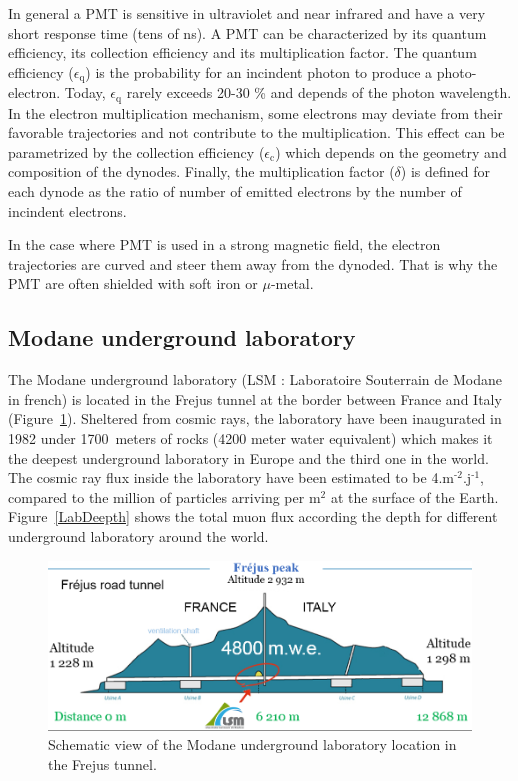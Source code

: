 \documentclass[main.tex]{subfiles}
\begin{document}
\bigskip


\NI In general a PMT is sensitive in ultraviolet and near infrared and have a very short response time (tens of ns). A PMT can be characterized by its quantum efficiency, its collection efficiency and its multiplication factor. The quantum efficiency ($\epsilon_\text{q}$) is the probability for an incindent photon to produce a photo-electron. Today, $\epsilon_\text{q}$ rarely  exceeds 20-30 \% and depends of the photon wavelength. In the electron multiplication mechanism, some electrons may deviate from their favorable trajectories and not contribute to the multiplication. This effect can be parametrized by the collection efficiency ($\epsilon_\text{c}$) which depends on the geometry and composition of the dynodes. Finally, the multiplication factor ($\delta$) is defined for each dynode as the ratio of number of emitted electrons by the number of incindent electrons.


\bigskip


\NI In the case where PMT is used in a strong magnetic field, the electron trajectories are curved and steer them away from the dynoded. That is why the PMT are often shielded with soft iron or $\mu$-metal. 


\FloatBarrier


\subsection{Modane underground laboratory}\label{sec:LSM}


\NI The Modane underground laboratory (LSM : Laboratoire Souterrain de Modane in french) is located in the Frejus tunnel at the border between France and Italy (Figure~\ref{LSMtunnel}).  Sheltered from cosmic rays, the laboratory have been inaugurated in 1982 under 1700~meters of rocks (4200 meter water equivalent) which makes it the deepest underground laboratory in Europe and the third one in the world. The cosmic ray flux inside the laboratory have been estimated to be 4.m$^\text{-2}$.j$^{\text{-1}}$, compared to the million of particles arriving per m$^\text{2}$ at the surface of the Earth. Figure~\ref{LabDeepth} shows the total muon flux according the depth for different underground laboratory around the world. 


\bigskip


\begin{figure}[h!]
\begin{center}
\includegraphics[scale=0.40]{pictures/Chap3/LSMtunnel.png}
\caption{Schematic view of the Modane underground laboratory location in the Frejus tunnel.}
\label{LSMtunnel}
\end{center}
\end{figure}
\end{document}
